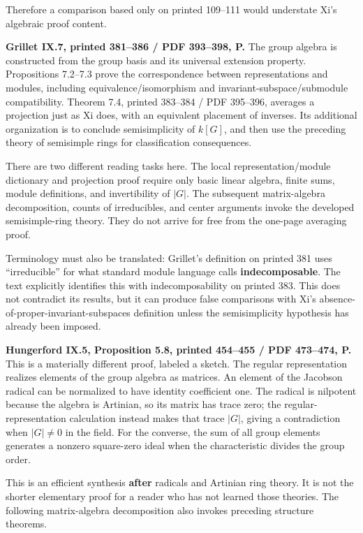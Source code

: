 \documentclass[
  11pt,
]{article}
\begin{document}
Therefore a comparison based only on printed 109--111 would understate
Xi's algebraic proof content.

\textbf{Grillet IX.7, printed 381--386 / PDF 393--398, P.} The group
algebra is constructed from the group basis and its universal extension
property. Propositions 7.2--7.3 prove the correspondence between
representations and modules, including equivalence/isomorphism and
invariant-subspace/submodule compatibility. Theorem 7.4, printed
383--384 / PDF 395--396, averages a projection just as Xi does, with an
equivalent placement of inverses. Its additional organization is to
conclude semisimplicity of \(k[G]\), and then use the preceding theory
of semisimple rings for classification consequences.

There are two different reading tasks here. The local
representation/module dictionary and projection proof require only basic
linear algebra, finite sums, module definitions, and invertibility of
\(|G|\). The subsequent matrix-algebra decomposition, counts of
irreducibles, and center arguments invoke the developed semisimple-ring
theory. They do not arrive for free from the one-page averaging proof.

Terminology must also be translated: Grillet's definition on printed 381
uses ``irreducible'' for what standard module language calls
\textbf{indecomposable}. The text explicitly identifies this with
indecomposability on printed 383. This does not contradict its results,
but it can produce false comparisons with Xi's
absence-of-proper-invariant-subspaces definition unless the
semisimplicity hypothesis has already been imposed.

\textbf{Hungerford IX.5, Proposition 5.8, printed 454--455 / PDF
473--474, P.} This is a materially different proof, labeled a sketch.
The regular representation realizes elements of the group algebra as
matrices. An element of the Jacobson radical can be normalized to have
identity coefficient one. The radical is nilpotent because the algebra
is Artinian, so its matrix has trace zero; the regular-representation
calculation instead makes that trace \(|G|\), giving a contradiction
when \(|G|\neq0\) in the field. For the converse, the sum of all group
elements generates a nonzero square-zero ideal when the characteristic
divides the group order.

This is an efficient synthesis \textbf{after} radicals and Artinian ring
theory. It is not the shorter elementary proof for a reader who has not
learned those theories. The following matrix-algebra decomposition also
invokes preceding structure theorems.
\end{document}
